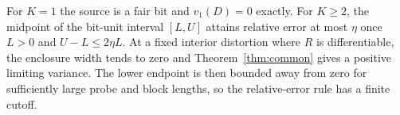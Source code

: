 \documentclass[11pt,letterpaper]{article}
\theoremstyle{definition}
\begin{document}
For $K=1$ the source is a fair bit and $v_1(D)=0$ exactly. For $K\ge2$, the midpoint of the bit-unit interval $[L,U]$ attains relative error at most $\eta$ once $L>0$ and $U-L\le2\eta L$. At a fixed interior distortion where $R$ is differentiable, the enclosure width tends to zero and Theorem~\ref{thm:common} gives a positive limiting variance. The lower endpoint is then bounded away from zero for sufficiently large probe and block lengths, so the relative-error rule has a finite cutoff.
\end{document}
